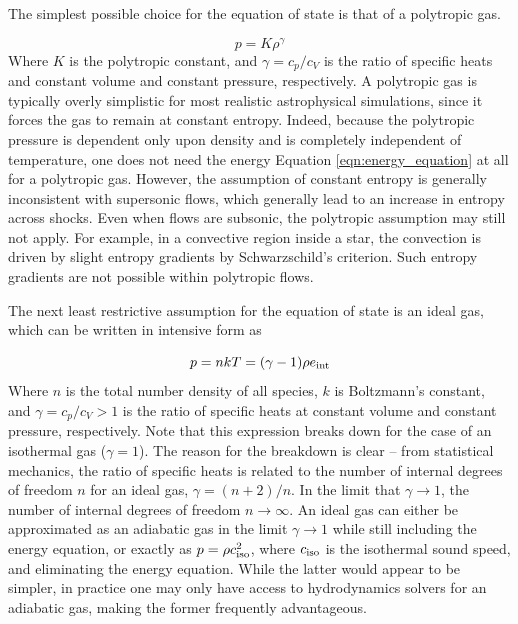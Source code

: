 \documentclass[notoc]{tufte-handout}
\begin{document}
The simplest possible choice for the equation of state is that of a polytropic gas.

\begin {equation}
p = K \rho^{\gamma}
\end {equation}
%
Where $K$ is the polytropic constant, and $\gamma = c_p / c_V$ is the ratio of specific heats and constant volume and constant pressure, respectively. A polytropic gas is typically overly simplistic for most realistic astrophysical simulations, since it forces the gas to remain at constant entropy. Indeed, because the polytropic pressure is dependent only upon density and is completely independent of temperature, one does not need the energy Equation \ref {eqn:energy_equation} at all for a polytropic gas.  However, the assumption of constant entropy is generally inconsistent with supersonic flows, which generally lead to an increase in entropy across shocks. Even when flows are subsonic, the polytropic assumption may still not apply. For example, in a convective region inside a star, the convection is driven by slight entropy gradients by Schwarzschild's criterion. Such entropy gradients are not possible within polytropic flows. 

The next least restrictive assumption for the equation of state is an ideal gas, which can be written in intensive form as

\begin {equation}
p =  n k T = (\gamma - 1) \rho e_{\rm int}
\end {equation}
%
Where $n$ is the total number density of all species, $k$ is Boltzmann's constant, and $\gamma = c_p / c_V > 1$ is the ratio of specific heats at constant volume and constant pressure, respectively. Note that this expression breaks down for the case of an isothermal gas ($\gamma = 1$). The reason for the breakdown is clear -- from statistical mechanics, the ratio of specific heats is related to the number of internal degrees of freedom $n$ for an ideal gas, $\gamma = (n + 2) / n$. In the limit that $\gamma \rightarrow 1$, the number of internal degrees of freedom $n \rightarrow \infty$.  An ideal gas can either be approximated as an adiabatic gas in the limit $\gamma \rightarrow 1$ while still including the energy equation, or exactly as $p = \rho c_{\rm iso}^2$, where $c_{\rm iso}$ is the isothermal sound speed, and eliminating the energy equation. While the latter would appear to be simpler, in practice one may only have access to hydrodynamics solvers for an adiabatic gas, making the former frequently advantageous. 
\end{document}
